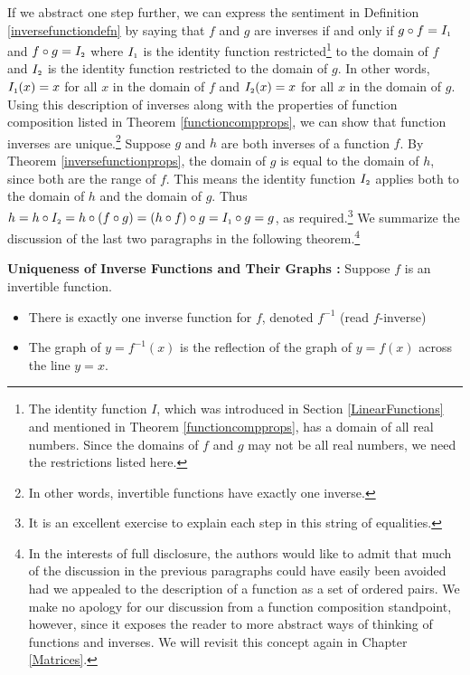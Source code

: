 If we abstract one step further, we can express the sentiment in Definition \ref{inversefunctiondefn} by saying that $f$ and $g$ are inverses if and only if  $g \circ f = I_{\mbox{\tiny $1$}}$ and $f \circ g = I_{\mbox{\tiny $2$}}$ where $I_{\mbox{\tiny $1$}}$ is the identity function restricted\footnote{The identity function $I$, which was introduced in Section \ref{LinearFunctions} and mentioned in Theorem \ref{functioncompprops}, has a domain of all real numbers.  Since the domains of $f$ and $g$ may not be all real numbers, we need the restrictions listed here.} to the domain of $f$ and $I_{\mbox{\tiny $2$}}$ is the identity function restricted to the domain of $g$.  In other words, $I_{\mbox{\tiny $1$}}(x) = x$ for all $x$ in the domain of $f$ and $I_{\mbox{\tiny $2$}}(x) = x$ for all $x$ in the domain of $g$.   Using this description of inverses along with the properties of function composition listed in Theorem  \ref{functioncompprops}, we can show that function inverses are unique.\footnote{In other words, invertible functions have exactly one inverse.}   Suppose $g$ and $h$ are both inverses of a function $f$. By Theorem \ref{inversefunctionprops}, the domain of $g$ is equal to the domain of $h$, since both are the range of $f$.  This means the identity function $I_{\mbox{\tiny $2$}}$ applies both to the domain of $h$ and the domain of $g$.  Thus $h = h \circ I_{\mbox{\tiny $2$}} = h \circ (f \circ g) = (h \circ f) \circ g = I_{\mbox{\tiny $1$}} \circ g = g$, as required.\footnote{It is an excellent exercise to explain each step in this string of equalities.}  We summarize the discussion of the last two paragraphs in the following theorem.\footnote{In the interests of full disclosure, the authors would like to admit that much of the discussion in the previous paragraphs could have easily been avoided had we appealed to the description of a function as a set of ordered pairs.  We make no apology for our discussion from a function composition standpoint, however, since it exposes the reader to more abstract ways of thinking of functions and inverses.  We will revisit this concept again in Chapter \ref{Matrices}.}

 \label{inversefunctionuniqueness}

\smallskip

\colorbox{ResultColor}{\bbm

\begin{thm} \label{inverseuniquegraph} \textbf{Uniqueness of Inverse Functions and Their Graphs :} Suppose $f$ is an invertible function.  

\begin{itemize}

\item  There is exactly one inverse function for $f$, denoted $f^{-1}$ (read $f$-inverse)

\item  The graph of $y=f^{-1}(x)$ is the reflection of the graph of $y=f(x)$ across the line $y=x$.

\end{itemize}

\end{thm}
\ebm}

